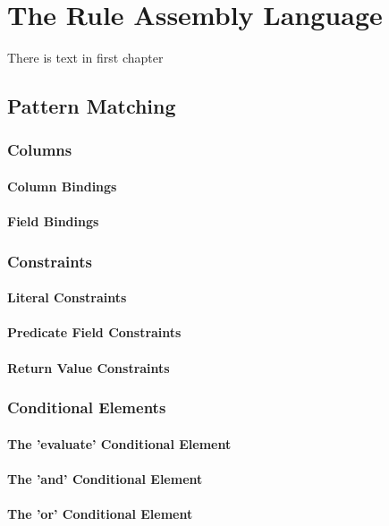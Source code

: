 \chapter{The Rule Assembly Language}
There is text in first chapter

\section{Pattern Matching}
\subsection{Columns}
\subsubsection{Column Bindings}
\subsubsection{Field Bindings}
                                       
\subsection{Constraints}
\subsubsection{Literal Constraints}
\subsubsection{Predicate Field Constraints}
\subsubsection{Return Value Constraints}

\subsection{Conditional Elements}
\subsubsection{The 'evaluate' Conditional Element}
\subsubsection{The 'and' Conditional Element}
\subsubsection{The 'or' Conditional Element}
